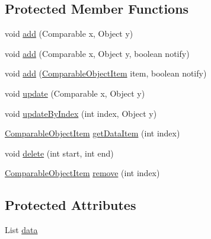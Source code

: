\subsection*{Protected Member Functions}
\begin{DoxyCompactItemize}
\item 
void \mbox{\hyperlink{classorg_1_1jfree_1_1data_1_1_comparable_object_series_ab1e01eda6532e976345fea55e00569cd}{add}} (Comparable x, Object y)
\item 
void \mbox{\hyperlink{classorg_1_1jfree_1_1data_1_1_comparable_object_series_af45e7280312d4dea5d8c21f045758ca5}{add}} (Comparable x, Object y, boolean notify)
\item 
void \mbox{\hyperlink{classorg_1_1jfree_1_1data_1_1_comparable_object_series_abe21ec873f0192445b71400a690c26b3}{add}} (\mbox{\hyperlink{classorg_1_1jfree_1_1data_1_1_comparable_object_item}{Comparable\+Object\+Item}} item, boolean notify)
\item 
void \mbox{\hyperlink{classorg_1_1jfree_1_1data_1_1_comparable_object_series_a63b31a6d9f4b27a310d5bc529c02c969}{update}} (Comparable x, Object y)
\item 
void \mbox{\hyperlink{classorg_1_1jfree_1_1data_1_1_comparable_object_series_acf27539e8d6e3d295a82e67544cc4bb1}{update\+By\+Index}} (int index, Object y)
\item 
\mbox{\hyperlink{classorg_1_1jfree_1_1data_1_1_comparable_object_item}{Comparable\+Object\+Item}} \mbox{\hyperlink{classorg_1_1jfree_1_1data_1_1_comparable_object_series_a76ff978830bd64e64f89c6656b5a40f7}{get\+Data\+Item}} (int index)
\item 
void \mbox{\hyperlink{classorg_1_1jfree_1_1data_1_1_comparable_object_series_ae5866252b9fedcee196a1572832f8d78}{delete}} (int start, int end)
\item 
\mbox{\hyperlink{classorg_1_1jfree_1_1data_1_1_comparable_object_item}{Comparable\+Object\+Item}} \mbox{\hyperlink{classorg_1_1jfree_1_1data_1_1_comparable_object_series_a28c33382767491892419d3cc15891f68}{remove}} (int index)
\end{DoxyCompactItemize}
\subsection*{Protected Attributes}
\begin{DoxyCompactItemize}
\item 
List \mbox{\hyperlink{classorg_1_1jfree_1_1data_1_1_comparable_object_series_abacebadb1f34908e900081407daaaa9b}{data}}
\end{DoxyCompactItemize}


